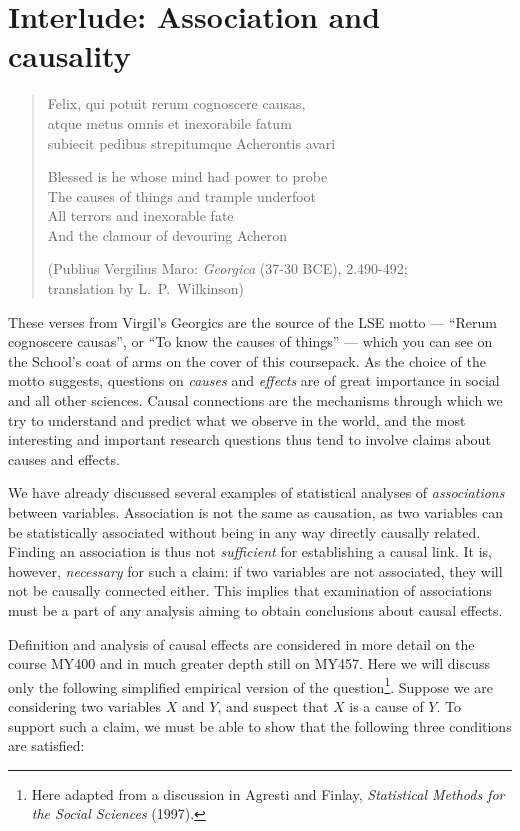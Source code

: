 \documentclass[11pt,a4paper,openany]{book}
\let\rmarkdownfootnote\footnote%
\def\footnote{\protect\rmarkdownfootnote}
\begin{document}
\newpage

\section{Interlude: Association and
causality}\label{s-regression-causality}

\begin{quote}
Felix, qui potuit rerum cognoscere causas,\\
atque metus omnis et inexorabile fatum\\
subiecit pedibus strepitumque Acherontis avari

Blessed is he whose mind had power to probe\\
The causes of things and trample underfoot\\
All terrors and inexorable fate\\
And the clamour of devouring Acheron

(Publius Vergilius Maro: \emph{Georgica} (37-30 BCE), 2.490-492;\\
translation by L.~P.~Wilkinson)
\end{quote}

These verses from Virgil's Georgics are the source of the LSE motto ---
``Rerum cognoscere causas'', or ``To know the causes of things'' ---
which you can see on the School's coat of arms on the cover of this
coursepack. As the choice of the motto suggests, questions on
\emph{causes} and \emph{effects} are of great importance in social and
all other sciences. Causal connections are the mechanisms through which
we try to understand and predict what we observe in the world, and the
most interesting and important research questions thus tend to involve
claims about causes and effects.

We have already discussed several examples of statistical analyses of
\emph{associations} between variables. Association is not the same as
causation, as two variables can be statistically associated without
being in any way directly causally related. Finding an association is
thus not \emph{sufficient} for establishing a causal link. It is,
however, \emph{necessary} for such a claim: if two variables are not
associated, they will not be causally connected either. This implies
that examination of associations must be a part of any analysis aiming
to obtain conclusions about causal effects.

Definition and analysis of causal effects are considered in more detail
on the course MY400 and in much greater depth still on MY457. Here we
will discuss only the following simplified empirical version of the
question\footnote{Here adapted from a discussion in Agresti and Finlay,
  \emph{Statistical Methods for the Social Sciences} (1997).}. Suppose
we are considering two variables \(X\) and \(Y\), and suspect that \(X\)
is a cause of \(Y\). To support such a claim, we must be able to show
that the following three conditions are satisfied:
\end{document}
